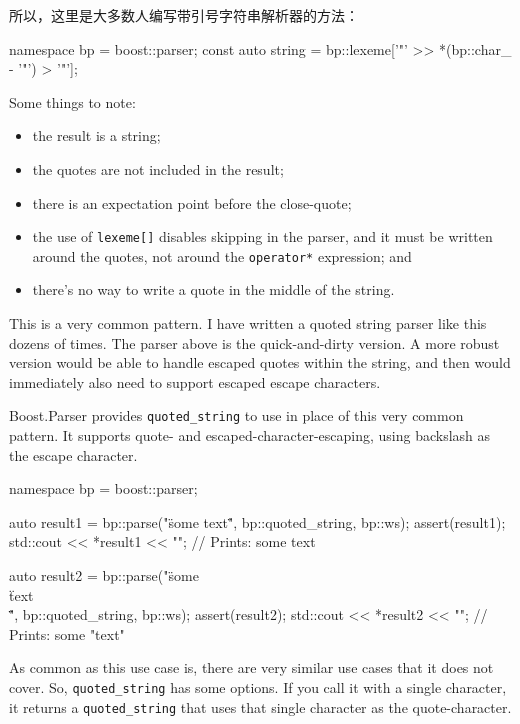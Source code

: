 所以，这里是大多数人编写带引号字符串解析器的方法：

\begin{code}
namespace bp = boost::parser;
const auto string = bp::lexeme['"' >> *(bp::char_ - '"') > '"'];
\end{code}

Some things to note:

\begin{itemize}
\item
  the result is a string;
\item
  the quotes are not included in the result;
\item
  there is an expectation point before the close-quote;
\item
  the use of \texttt{lexeme{[}{]}} disables skipping in the parser, and it must be written around the quotes, not around the \texttt{operator*} expression; and
\item
  there's no way to write a quote in the middle of the string.
\end{itemize}

This is a very common pattern. I have written a quoted string parser like this dozens of times. The parser above is the quick-and-dirty version. A more robust version would be able to handle escaped quotes within the string, and then would immediately also need to support escaped escape characters.

Boost.Parser provides \texttt{quoted\_string} to use in place of this very common pattern. It supports quote- and escaped-character-escaping, using backslash as the escape character.

\begin{code}
namespace bp = boost::parser;

auto result1 = bp::parse("\"some text\"", bp::quoted_string, bp::ws);
assert(result1);
std::cout << *result1 << "\n"; // Prints: some text

auto result2 =
    bp::parse("\"some \\\"text\\\"\"", bp::quoted_string, bp::ws);
assert(result2);
std::cout << *result2 << "\n"; // Prints: some "text"
\end{code}

As common as this use case is, there are very similar use cases that it does not cover. So, \texttt{quoted\_string} has some options. If you call it with a single character, it returns a \texttt{quoted\_string} that uses that single character as the quote-character.

